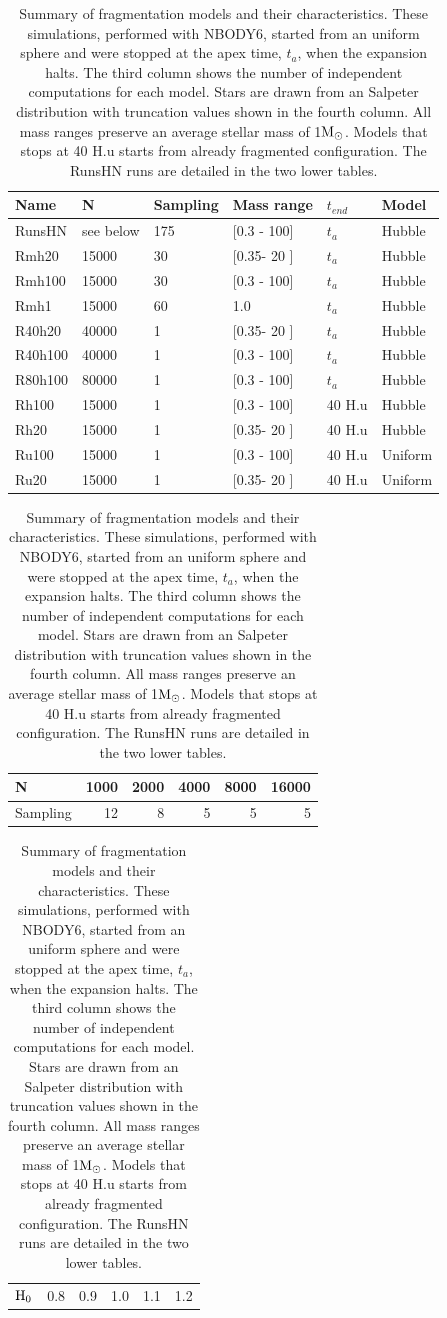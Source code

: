    
   
   


\begin{table}
\begin{center}
\caption{Summary of fragmentation models and their characteristics. These simulations, performed with NBODY6, started from an uniform sphere and were stopped at the apex time, $t_a$, when the expansion halts. The third column shows the number of independent computations for each model. Stars are drawn from an Salpeter distribution with truncation values shown in the fourth column. All mass ranges preserve an average stellar mass of 1${\textrm{M}_\odot}$. Models that stops at 40 H.u starts from already fragmented configuration. The RunsHN runs are detailed in the two lower tables.}
\label{Tab:2_models}
\begin{tabularx}{0.8\textwidth}{XXXXXX}
\hline
Name & N & Sampling & Mass range & $t_{end}$ & Model \\
\hline
RunsHN & see below & 175 & [0.3 - 100] & $t_a$ & Hubble \\
Rmh20 & 15000 & 30 & [0.35- 20 ] & $t_a$ & Hubble\\
Rmh100 & 15000 & 30 & [0.3 - 100] & $t_a$ & Hubble\\
Rmh1 & 15000 & 60 & 1.0  & $t_a$ & Hubble \\
R40h20 & 40000 & 1 & [0.35- 20 ] & $t_a$ & Hubble \\
R40h100 & 40000 & 1 & [0.3 - 100]& $t_a$ & Hubble \\
R80h100 & 80000 & 1 & [0.3 - 100] & $t_a$ & Hubble\\
Rh100 & 15000 & 1 & [0.3 - 100] & 40 H.u & Hubble \\
Rh20 & 15000 & 1 & [0.35- 20 ] & 40 H.u & Hubble\\
Ru100 & 15000 & 1 & [0.3 - 100]& 40 H.u & Uniform\\
Ru20 & 15000 & 1 & [0.35- 20 ] & 40 H.u & Uniform\\
\hline
\end{tabularx}
\end{center}
\begin{center}
\begin{tabular}{l|rrrrr}
\centering
N   & 1000 & 2000 & 4000 & 8000 & 16000\\ 
\hline
Sampling & 12 & 8 & 5 & 5 & 5\\
\end{tabular}
\end{center}
\begin{center}
\begin{tabular}{l|rrrrr}
${\textrm{H}}_0$ & 0.8 & 0.9 & 1.0 & 1.1 & 1.2
\end{tabular}
\end{center}
\end{table}

